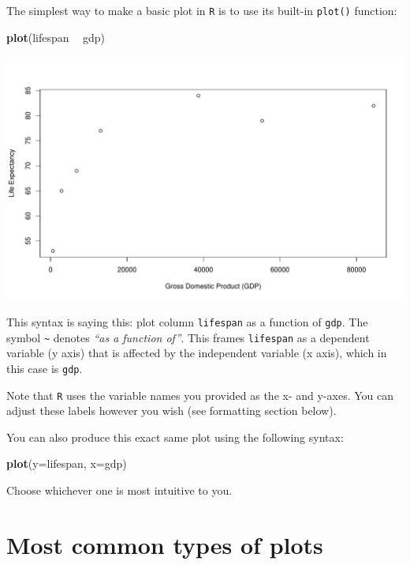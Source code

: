 \documentclass[
]{book}
\newenvironment{Shaded}{\begin{snugshade}}{\end{snugshade}}
\newcommand{\DataTypeTok}[1]{\textcolor[rgb]{0.13,0.29,0.53}{#1}}
\newcommand{\KeywordTok}[1]{\textcolor[rgb]{0.13,0.29,0.53}{\textbf{#1}}}
\newcommand{\NormalTok}[1]{#1}
\newcommand{\OperatorTok}[1]{\textcolor[rgb]{0.81,0.36,0.00}{\textbf{#1}}}
\newcommand{\StringTok}[1]{\textcolor[rgb]{0.31,0.60,0.02}{#1}}
\begin{document}
The simplest way to make a basic plot in \texttt{R} is to use its built-in \texttt{plot()} function:

\begin{Shaded}
\begin{Highlighting}[]
\KeywordTok{plot}\NormalTok{(lifespan }\OperatorTok{~}\StringTok{ }\NormalTok{gdp)}
\end{Highlighting}
\end{Shaded}

\includegraphics{figures/unnamed-chunk-82-1.pdf}

This syntax is saying this: plot column \texttt{lifespan} as a function of \texttt{gdp}. The symbol \texttt{\textasciitilde{}} denotes \emph{``as a function of''}. This frames \texttt{lifespan} as a dependent variable (y axis) that is affected by the independent variable (x axis), which in this case is \texttt{gdp}.

Note that \texttt{R} uses the variable names you provided as the x- and y-axes. You can adjust these labels however you wish (see formatting section below).

You can also produce this exact same plot using the following syntax:

\begin{Shaded}
\begin{Highlighting}[]
\KeywordTok{plot}\NormalTok{(}\DataTypeTok{y=}\NormalTok{lifespan, }\DataTypeTok{x=}\NormalTok{gdp)}
\end{Highlighting}
\end{Shaded}

Choose whichever one is most intuitive to you.

\hypertarget{most-common-types-of-plots}{%
\section*{Most common types of plots}\label{most-common-types-of-plots}}
\end{document}
